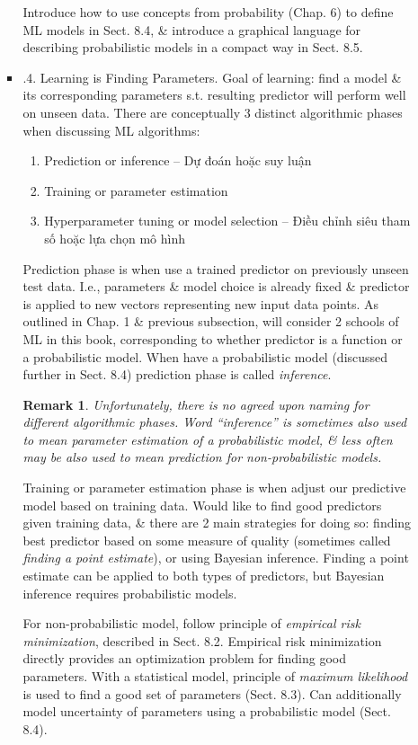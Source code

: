 \documentclass{article}
\newtheorem{remark}{Remark}
\begin{document}
\begin{itemize}
\begin{itemize}
\begin{itemize}
			Introduce how to use concepts from probability (Chap. 6) to define ML models in Sect. 8.4, \& introduce a graphical language for describing probabilistic models in a compact way in Sect. 8.5.
			\item {.4. Learning is Finding Parameters.} Goal of learning: find a model \& its corresponding parameters s.t. resulting predictor will perform well on unseen data. There are conceptually 3 distinct algorithmic phases when discussing ML algorithms:
			\begin{enumerate}
				\item Prediction or inference -- Dự đoán hoặc suy luận
				\item Training or parameter estimation
				\item Hyperparameter tuning or model selection -- Điều chỉnh siêu tham số hoặc lựa chọn mô hình
			\end{enumerate}
			Prediction phase is when use a trained predictor on previously unseen test data. I.e., parameters \& model choice is already fixed \& predictor is applied to new vectors representing new input data points. As outlined in Chap. 1 \& previous subsection, will consider 2 schools of ML in this book, corresponding to whether predictor is a function or a probabilistic model. When have a probabilistic model (discussed further in Sect. 8.4) prediction phase is called {\it inference}.
			\begin{remark}
				Unfortunately, there is no agreed upon naming for different algorithmic phases. Word ``inference'' is sometimes also used to mean parameter estimation of a probabilistic model, \& less often may be also used to mean prediction for non-probabilistic models.
			\end{remark}
			Training or parameter estimation phase is when adjust our predictive model based on training data. Would like to find good predictors given training data, \& there are 2 main strategies for doing so: finding best predictor based on some measure of quality (sometimes called {\it finding a point estimate}), or using Bayesian inference. Finding a point estimate can be applied to both types of predictors, but Bayesian inference requires probabilistic models.
			
			For non-probabilistic model, follow principle of {\it empirical risk minimization}, described in Sect. 8.2. Empirical risk minimization directly provides an optimization problem for finding good parameters. With a statistical model, principle of {\it maximum likelihood} is used to find a good set of parameters (Sect. 8.3). Can additionally model uncertainty of parameters using a probabilistic model (Sect. 8.4).
			

\end{itemize}
\end{itemize}
\end{itemize}
\end{document}
